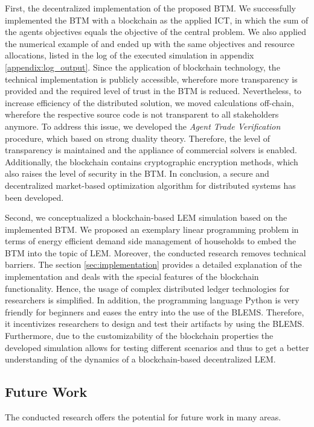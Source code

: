 First, the decentralized implementation of the proposed BTM. 
We successfully implemented the BTM with a blockchain as the applied ICT, 
in which the sum of the agents objectives equals the objective of the central problem. 
We also applied the numerical example of  and 
ended up with the same objectives and resource allocations, listed in the log 
of the executed simulation in appendix \ref{appendix:log_output}.
Since the application of blockchain technology, the technical implementation
is publicly accessible, wherefore more transparency is provided and the 
required level of trust in the BTM is reduced. 
Nevertheless, to increase efficiency of the distributed solution,
we moved calculations off-chain, wherefore the respective source code 
is not transparent to all stakeholders anymore.
To address this issue, we developed the \textit{Agent Trade Verification} procedure,
which based on strong duality theory.
Therefore, the level of transparency is maintained and
the appliance of commercial solvers is enabled. 
Additionally, the blockchain contains cryptographic encryption methods,
which also raises the level of security in the BTM.
In conclusion, a secure and decentralized market-based optimization algorithm for distributed systems has 
been developed.

Second, we conceptualized a blockchain-based LEM simulation based on the implemented
BTM. We proposed an exemplary linear programming problem in terms of 
energy efficient demand side management of households to embed the BTM into the topic of LEM.
Moreover, the conducted research removes technical barriers.
The section \ref{sec:implementation} provides a detailed 
explanation of the implementation and deals with the special features 
of the blockchain functionality.
Hence, the usage of complex distributed ledger technologies for researchers
is simplified. 
In addition, the programming language Python is very 
friendly for beginners and eases the entry into the use of the BLEMS.
Therefore, it incentivizes researchers 
to design and test their artifacts by using the BLEMS.
Furthermore, due to the customizability of the blockchain properties 
the developed simulation allows for testing different scenarios and thus 
to get a better understanding of the dynamics of a blockchain-based decentralized LEM.

\subsection{Future Work}
The conducted research offers the potential for future work in many areas.

